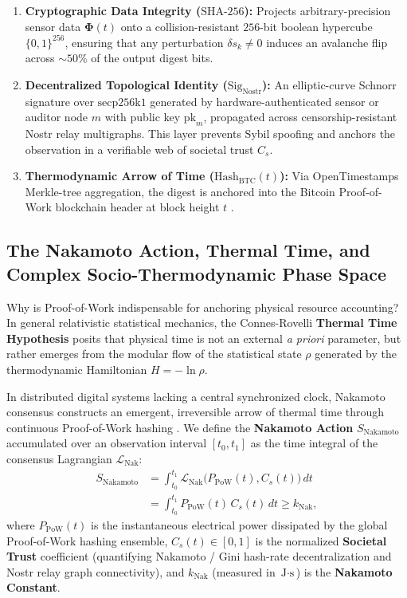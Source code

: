 \documentclass[aps,pre,twocolumn,10pt,superscriptaddress,amsmath,amssymb,amsfonts,floatfix,showkeys]{revtex4-2}
\begin{document}
\begin{enumerate}
    \item \textbf{Cryptographic Data Integrity ($\text{SHA-256}$):} Projects arbitrary-precision sensor data $\bm{\Phi}(t)$ onto a collision-resistant $256$-bit boolean hypercube $\{0,1\}^{256}$, ensuring that any perturbation $\delta s_k \neq 0$ induces an avalanche flip across $\sim 50\%$ of the output digest bits.
    \item \textbf{Decentralized Topological Identity ($\text{Sig}_{\text{Nostr}}$):} An elliptic-curve Schnorr signature over $\text{secp256k1}$ generated by hardware-authenticated sensor or auditor node $m$ with public key $\text{pk}_m$, propagated across censorship-resistant Nostr relay multigraphs. This layer prevents Sybil spoofing and anchors the observation in a verifiable web of societal trust $C_s$.
    \item \textbf{Thermodynamic Arrow of Time ($\text{Hash}_{\text{BTC}}(t)$):} Via OpenTimestamps Merkle-tree aggregation, the digest is anchored into the Bitcoin Proof-of-Work blockchain header at block height $t$ \cite{Nakamoto2008, Szabo2002, Bailey2024}.
\end{enumerate}

\subsection{The Nakamoto Action, Thermal Time, and Complex Socio-Thermodynamic Phase Space}

Why is Proof-of-Work indispensable for anchoring physical resource accounting? In general relativistic statistical mechanics, the Connes-Rovelli \textbf{Thermal Time Hypothesis} \cite{ConnesRovelli1994} posits that physical time is not an external \textit{a priori} parameter, but rather emerges from the modular flow of the statistical state $\rho$ generated by the thermodynamic Hamiltonian $H = -\ln \rho$.

In distributed digital systems lacking a central synchronized clock, Nakamoto consensus constructs an emergent, irreversible arrow of thermal time through continuous Proof-of-Work hashing \cite{RanaoraYii2026, RanaoraNash2026, RanaoraThermo2026}. We define the \textbf{Nakamoto Action} $S_{\text{Nakamoto}}$ accumulated over an observation interval $[t_0, t_1]$ as the time integral of the consensus Lagrangian $\mathcal{L}_{\text{Nak}}$:
\begin{equation}
\begin{aligned}
    S_{\text{Nakamoto}} &= \int_{t_0}^{t_1} \mathcal{L}_{\text{Nak}}\big(P_{\text{PoW}}(t), C_s(t)\big)\,dt \\
    &= \int_{t_0}^{t_1} P_{\text{PoW}}(t) \, C_s(t) \, dt \ge k_{\text{Nak}},
\end{aligned}
\label{eq:nakamoto_action_formal}
\end{equation}
where $P_{\text{PoW}}(t)$ is the instantaneous electrical power dissipated by the global Proof-of-Work hashing ensemble, $C_s(t) \in [0, 1]$ is the normalized \textbf{Societal Trust} coefficient (quantifying Nakamoto / Gini hash-rate decentralization and Nostr relay graph connectivity), and $k_{\text{Nak}}$ (measured in $\text{J}\cdot\text{s}$) is the \textbf{Nakamoto Constant}.
\end{document}
